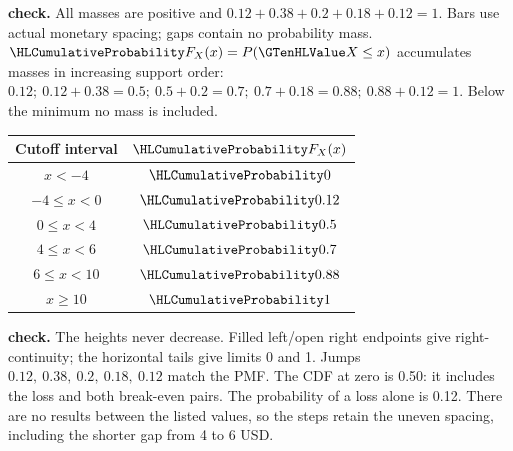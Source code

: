 \textbf{ check.} All masses are positive and $0.12+0.38+0.2+0.18+0.12=1$. Bars use actual monetary spacing; gaps contain no probability mass.
\clearpage
{}
$\cTwoCDFHL{F_X(x)}=P(\cTwoValue{X}\leq x)$ accumulates masses in increasing support order: $0.12;\ 0.12+0.38=0.5;\ 0.5+0.2=0.7;\ 0.7+0.18=0.88;\ 0.88+0.12=1$. Below the minimum no mass is included.
\par\noindent\begin{minipage}[t]{.38\linewidth}\vspace{0pt}\centering\begin{tabular}{cc}\toprule Cutoff interval & $\cTwoCDFHL{F_X(x)}$ \\\midrule
$x<-4$ & $\cTwoCDFHL{0}$ \\
$-4\leq x<0$ & $\cTwoCDFHL{0.12}$ \\
$0\leq x<4$ & $\cTwoCDFHL{0.5}$ \\
$4\leq x<6$ & $\cTwoCDFHL{0.7}$ \\
$6\leq x<10$ & $\cTwoCDFHL{0.88}$ \\
$x\geq 10$ & $\cTwoCDFHL{1}$ \\
\bottomrule\end{tabular}\end{minipage}\hfill\begin{minipage}[t]{.59\linewidth}\vspace{0pt}\centering{}\end{minipage}\par
\textbf{ check.} The heights never decrease. Filled left/open right endpoints give right-continuity; the horizontal tails give limits 0 and 1. Jumps $0.12,\ 0.38,\ 0.2,\ 0.18,\ 0.12$ match the PMF. The CDF at zero is 0.50: it includes the loss and both break-even pairs. The probability of a loss alone is 0.12. There are no results between the listed values, so the steps retain the uneven spacing, including the shorter gap from 4 to 6 USD.
\clearpage
